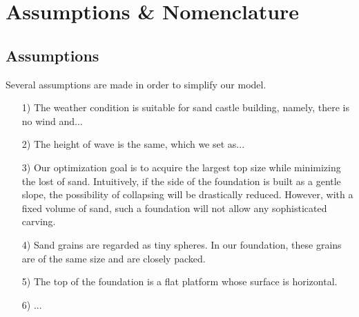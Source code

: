 \documentclass[12pt]{article}
\begin{document}
\section{Assumptions \& Nomenclature}
\subsection{Assumptions}
Several assumptions are made in order to simplify our model.
\begin{itemize}
    \item [1)]
          The weather condition is suitable for sand castle building, namely, there is no wind and...
    \item [2)]
          The height of wave is the same, which we set as...
    \item [3)]
          Our optimization goal is to acquire the largest top size while minimizing the lost of sand. Intuitively, if the side of the foundation is built as a gentle slope, the possibility of collapsing will be drastically reduced. However, with a fixed volume of sand, such a foundation will not allow any sophisticated carving.
    \item [4)]
          Sand grains are regarded as tiny spheres. In our foundation, these grains are of the same size and are closely packed.
    \item [5)]
          The top of the foundation is a flat platform whose surface is horizontal.
    \item [6)]
          ...
\end{itemize}
\end{document}

